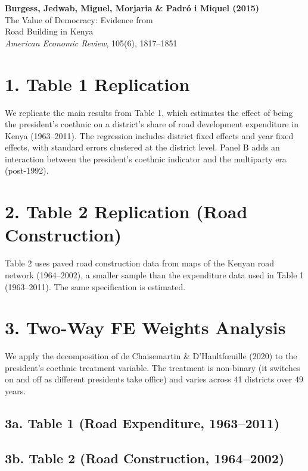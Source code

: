 \documentclass[12pt]{article}
\begin{document}
\begin{center}
{\Large\bfseries Burgess, Jedwab, Miguel, Morjaria \& Padr\'o i Miquel (2015)}\\
{\large The Value of Democracy: Evidence from}\\
{\large Road Building in Kenya}\\
\vspace{0.5em}
{\normalsize \textit{American Economic Review}, 105(6), 1817--1851}
\end{center}

\vspace{1em}

\section*{1. Table 1 Replication}

We replicate the main results from Table 1, which estimates the effect 
of being the president's coethnic on a district's share of road 
development expenditure in Kenya (1963--2011). 
The regression includes district fixed effects and year fixed effects, 
with standard errors clustered at the district level. 
Panel B adds an interaction between the president's coethnic 
indicator and the multiparty era (post-1992).



\clearpage

\section*{2. Table 2 Replication (Road Construction)}

Table 2 uses paved road construction data from maps of the Kenyan 
road network (1964--2002), a smaller sample than the expenditure data 
used in Table 1 (1963--2011). The same specification is estimated.



\clearpage

\section*{3. Two-Way FE Weights Analysis}

We apply the decomposition of de Chaisemartin \& D'Haultf\oe uille (2020) 
to the president's coethnic treatment variable. The treatment is non-binary 
(it switches on and off as different presidents take office) and varies 
across 41 districts over 49 years.

\subsection*{3a. Table 1 (Road Expenditure, 1963--2011)}



\clearpage

\subsection*{3b. Table 2 (Road Construction, 1964--2002)}


\end{document}
